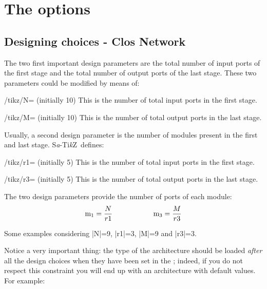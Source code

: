 \documentclass{ltxdoc} %
\newcommand\Tikz{Ti\textit kZ}
\newcommand{\saTikZ}{\textsc S\textit a-\Tikz}
\begin{document}
\section{The options}
\subsection{Designing choices - Clos Network}
The two first important design parameters are the total number of input ports of the first stage and the total number of output ports of the last stage. These two parameters could be modified by means of:
\begin{key}{/tikz/N= (initially 10)}
    This is the number of total input ports in the first stage.
\end{key}

\begin{key}{/tikz/M= (initially 10)}
    This is the number of total output ports in the last stage.
\end{key}
Usually, a second design parameter is the number of modules present in the first and last stage. \saTikZ\ defines:
\begin{key}{/tikz/r1= (initially 5)}
    This is the number of total input ports in the first stage.
\end{key}

\begin{key}{/tikz/r3= (initially 5)}
    This is the number of total output ports in the last stage.
\end{key}
The two design parameters provide the number of ports of each module:
\[\textrm{m}_1=\dfrac{N}{r1} \hspace*{2cm} \textrm{m}_3=\dfrac{M}{r3} \]

Some examples considering |N|=9, |r1|=3, |M|=9 and |r3|=3.
\begin{codeexample}[]
\begin{tikzpicture}
    \node[N=9,r1=3,M=9,r3=3,clos rear] {};
\end{tikzpicture}
\end{codeexample}

\begin{codeexample}[]
\begin{tikzpicture}
    \node[N=9,r1=3,M=9,r3=3,clos snb] {};
\end{tikzpicture}
\end{codeexample}

Notice a very important thing: the type of the architecture should be loaded \emph{after} all the design choices when they have been set in the ; indeed, if you do not respect this constraint you will end up with an architecture with default values. For example:
\end{document}
